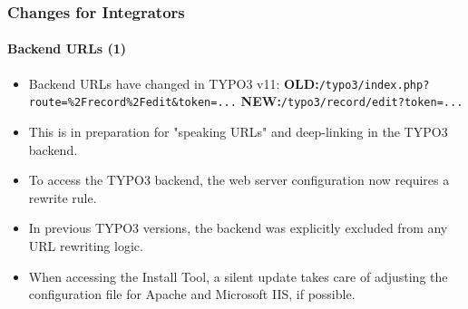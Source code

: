 %

\begin{frame}[fragile]
	\frametitle{Changes for Integrators}
	\framesubtitle{Backend URLs (1)}

	\begin{itemize}
		\item Backend URLs have changed in TYPO3 v11:\newline
			\small
				\textbf{OLD:}\tabto{1.1cm}\texttt{/typo3/index.php?route=\%2Frecord\%2Fedit\&token=...}\newline
				\textbf{NEW:}\tabto{1.1cm}\texttt{/typo3/record/edit?token=...}
			\normalsize

		\item This is in preparation for "speaking URLs" and deep-linking in the
			TYPO3 backend.
		\item To access the TYPO3 backend, the web server configuration now
			requires a rewrite rule.
		\item In previous TYPO3 versions, the backend was explicitly excluded
			from any URL rewriting logic.
		\item When accessing the Install Tool, a silent update takes care of
			adjusting the configuration file for Apache and Microsoft IIS,
			if possible.

	\end{itemize}
\end{frame}

